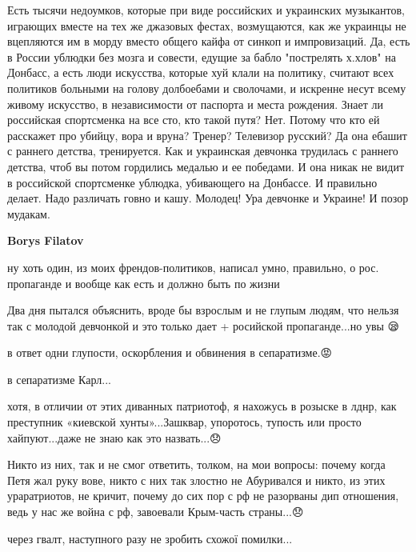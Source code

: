 \begin{itemize}
Есть тысячи недоумков, которые при виде российских и украинских музыкантов,
играющих вместе на тех же джазовых фестах, возмущаются, как же украинцы не
вцепляются им в морду вместо общего кайфа от синкоп и импровизаций. Да, есть в
России ублюдки без мозга и совести, едущие за бабло "пострелять х.хлов" на
Донбасс, а есть люди искусства, которые хуй клали на политику, считают всех
политиков больными на голову долбоебами и сволочами, и искренне несут всему
живому искусство, в независимости от паспорта и места рождения. Знает ли
российская спортсменка на все сто, кто такой путя? Нет. Потому что кто ей
расскажет про убийцу, вора и вруна? Тренер? Телевизор русский? Да она ебашит с
раннего детства, тренируется. Как и украинская девчонка трудилась с раннего
детства, чтоб вы потом гордились медалью и ее победами. И она никак не видит в
российской спортсменке ублюдка, убивающего на Донбассе. И правильно делает.
Надо различать говно и кашу. Молодец! Ура девчонке и Украине! И позор мудакам.

 
\textbf{Borys Filatov} 

ну хоть один, из моих френдов-политиков, написал умно, правильно, о рос.
пропаганде и вообще как есть и должно быть по жизни🤝

Два дня пытался объяснить, вроде бы взрослым и не глупым людям, что нельзя так с
молодой девчонкой и это только дает + росийской пропаганде...но увы 😪

в ответ одни глупости, оскорбления и обвинения в сепаратизме.😡

в сепаратизме Карл...\Laughey[1.0][white]

хотя, в отличии от этих диванных патриотоф, я нахожусь в розыске в лднр, как
преступник «киевской хунты»...\Laughey[1.0][white]Зашквар, упоротось, тупость или просто хайпуют...даже
не знаю как это назвать...😞

Никто из них, так и не смог ответить, толком, на мои вопросы: почему когда Петя
жал руку вове, никто с них так злостно не Абуривался и никто, из этих
ураратриотов, не кричит, почему до сих пор с рф не разорваны дип отношения, ведь у
нас же война с рф, завоевали Крым-часть страны...😞


 
через гвалт, наступного разу не зробить схожої помилки...

\end{itemize}

